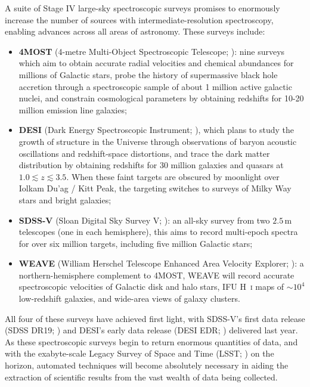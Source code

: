 \documentclass[fleqn,usenatbib]{mnras}
\begin{document}
A suite of Stage IV large-sky spectroscopic surveys promises to enormously increase the number of sources with intermediate-resolution spectroscopy, enabling advances across all areas of astronomy.
These surveys include:
\begin{itemize}
\item
\textbf{4MOST}
(4-metre Multi-Object Spectroscopic Telescope; \citealt{4most}): nine surveys which aim to obtain accurate radial velocities and chemical abundances for millions of Galactic stars, probe the history of supermassive black hole accretion through a spectroscopic sample of about 1 million active galactic nuclei, and constrain cosmological parameters by obtaining redshifts for 10-20 million emission line galaxies;
\item
\textbf{DESI}
(Dark Energy Spectroscopic Instrument; \citealt{desii, desiii}), which plans to study the growth of structure in the Universe through observations of baryon acoustic oscillations and redshift-space distortions, and trace the dark matter distribution by obtaining redshifts for 30 million galaxies and quasars at $1.0\lesssim z \lesssim 3.5$.
When these faint targets are obscured by moonlight over Iolkam Du'ag / Kitt Peak, the targeting switches to surveys of Milky Way stars and bright galaxies;
\item
\textbf{SDSS-V}
(Sloan Digital Sky Survey V; \citealt{sdssv}):
an all-sky survey from two $2.5\,\text{m}$ telescopes (one in each hemisphere), this aims to record multi-epoch spectra for over six million targets, including five million Galactic stars;
\item
\textbf{WEAVE}
(William Herschel Telescope Enhanced Area Velocity Explorer; \citealt{weave}): a northern-hemisphere complement to 4MOST, WEAVE will record accurate spectroscopic velocities of Galactic disk and halo stars, IFU H~\textsc{i} maps of $\sim10^4$ low-redshift galaxies, and wide-area views of galaxy clusters.
\end{itemize}
All four of these surveys have achieved first light, with SDSS-V's first data release (SDSS DR19; \citealt{sdssdr19}) and DESI's early data release (DESI EDR; \citealt{desiedr}) delivered last year.
As these spectroscopic surveys begin to return enormous quantities of data, and with the exabyte-scale Legacy Survey of Space and Time (LSST; \citealt{lsst}) on the horizon, automated techniques will become absolutely necessary in aiding the extraction of scientific results from the vast wealth of data being collected.
\end{document}
